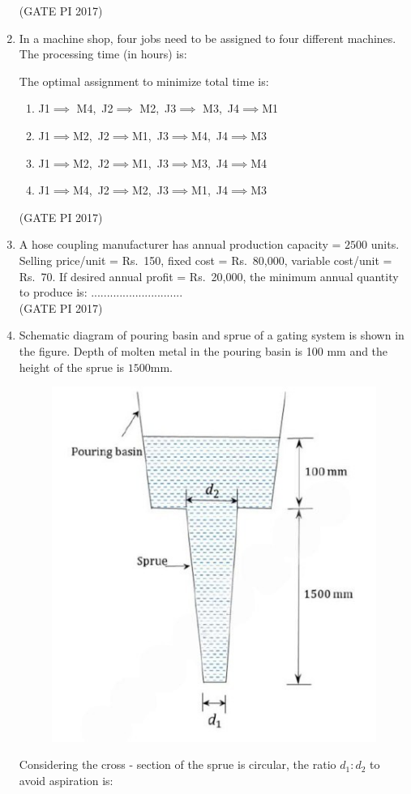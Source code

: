 \documentclass[journal,12pt,onecolumn]{IEEEtran}
\theoremstyle{remark}
\begin{document}
\begin{enumerate}
\hfill (GATE PI 2017)

\item In a machine shop, four jobs need to be assigned to four different machines. The processing time (in hours) is:



The optimal assignment to minimize total time is:
\begin{enumerate}
\item J1$\implies$ M4,\ J2$\implies$ M2,\ J3$\implies$ M3,\ J4$\implies$M1
\item J1$\implies$M2,\ J2$\implies$M1,\ J3$\implies$M4,\ J4$\implies$M3
\item J1$\implies$M2,\ J2$\implies$M1,\ J3$\implies$M3,\ J4$\implies$M4
\item J1$\implies$M4,\ J2$\implies$M2,\ J3$\implies$M1,\ J4$\implies$M3
\end{enumerate}
\hfill (GATE PI 2017)

\item A hose coupling manufacturer has annual production capacity = $2500$ units.  
Selling price/unit = Rs.\ 150, fixed cost = Rs.\ 80{,}000, variable cost/unit = Rs.\ 70.  
If desired annual profit = Rs.\ 20{,}000, the minimum annual quantity to produce is:  
............................. \\

\hfill (GATE PI 2017)

\item Schematic diagram of pouring basin and sprue of a gating system is shown in the figure.  
Depth of molten metal in the pouring basin is 100 mm and the height of the sprue is $1500$mm.  



\begin{figure}[h]
    \centering
    \includegraphics[width=0.3\linewidth]{fig9.png}
    \caption{}
    \label{fig:placeholder}
\end{figure}

Considering the cross \-- section of the sprue is circular, the ratio $d_{1} : d_{2}$ to avoid aspiration is:


\end{enumerate}
\end{document}
